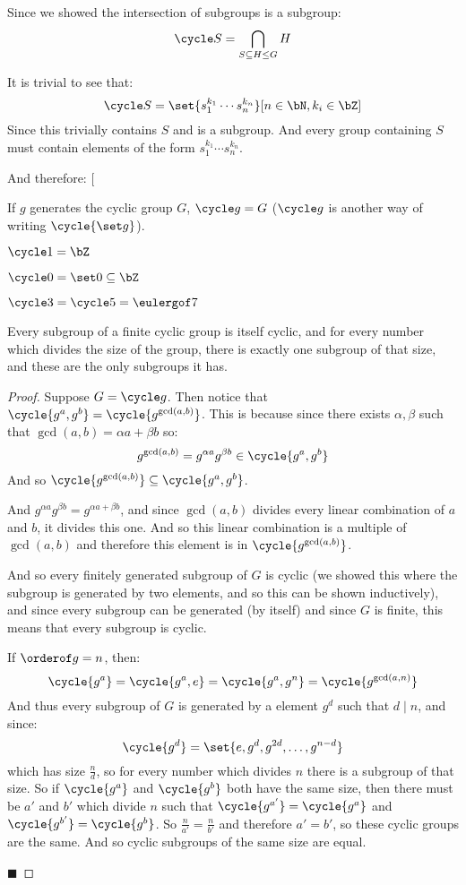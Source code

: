 \documentclass[10pt]{article}
\makeatletter
\def\@blist[#1]{%
    \bgroup\bgroup\par\vskip-\medskipamount%
    \gdef\item{%
        \par\egroup\bgroup\medskip\setbox0=\hbox{#1\quad}%
        \advance\leftskip by \wd0\leavevmode\kern-\wd0\box0%
    }%
}
\def\blist{\@ifnextchar[ \@blist {\@blist[$\bullet$]}}
\def\elist{\par\egroup\egroup\medskip}
\let\divides=\mid
\makeatother
\begin{document}
Since we showed the intersection of subgroups is a subgroup:
\[ \cycle S = \bigcap_{S\subseteq H\leq G} H \]

It is trivial to see that:
\[ \cycle S = \set{s_1^{k_1}\cdots s_n^{k_n}}[n\in\bN, k_i\in\bZ] \]
Since this trivially contains $S$ and is a subgroup.
And every group containing $S$ must contain elements of the form $s_1^{k_1}\cdots s_n^{k_n}$.

And therefore:
\blist
    \item If $g$ generates the cyclic group $G$, $\cycle g = G$ ($\cycle g$ is another way of writing $\cycle{\set g}$).
    \item $\cycle 1 = \bZ$
    \item $\cycle 0 = \set 0 \subseteq \bZ$
    \item $\cycle 3 = \cycle 5 = \eulergof 7$
\elist

\begin{thrm*}

    Every subgroup of a finite cyclic group is itself cyclic, and for every number which divides the size of the group, there is exactly one subgroup of that size,
    and these are the only subgroups it has.

\end{thrm*}

\begin{proof}

    Suppose $G=\cycle g$.
    Then notice that $\cycle{g^a, g^b}=\cycle{g^{\gcd(a,b)}}$.
    This is because since there exists $\alpha,\beta$ such that $\gcd(a,b)=\alpha a+\beta b$ so:
    \[ g^{\gcd(a,b)} = g^{\alpha a}g^{\beta b}\in\cycle{g^a, g^b} \]
    And so $\cycle{g^{\gcd(a,b)}}\subseteq\cycle{g^a,g^b}$.

    And $g^{\alpha a}g^{\beta b}=g^{\alpha a + \beta b}$, and since $\gcd(a,b)$ divides every linear combination of $a$ and $b$, it divides this one.
    And so this linear combination is a multiple of $\gcd(a,b)$ and therefore this element is in $\cycle{g^{\gcd(a,b)}}$.

    And so every finitely generated subgroup of $G$ is cyclic (we showed this where the subgroup is generated by two elements, and so this can be shown inductively), and since
    every subgroup can be generated (by itself) and since $G$ is finite, this means that every subgroup is cyclic.

    If $\orderof g=n$, then:
        \[ \cycle{g^a} = \cycle{g^a, e} = \cycle{g^a, g^n} = \cycle{g^{\gcd(a,n)}} \]
    And thus every subgroup of $G$ is generated by a element $g^d$ such that $d\divides n$, and since:
        \[ \cycle{g^d} = \set{e, g^d, g^{2d}, \dots, g^{n-d}} \]
    which has size $\frac nd$, so for every number which divides $n$ there is a subgroup of that size.
    So if $\cycle{g^a}$ and $\cycle{g^b}$ both have the same size, then there must be $a'$ and $b'$ which divide $n$ such that $\cycle{g^{a'}}=\cycle{g^a}$ and
    $\cycle{g^{b'}}=\cycle{g^b}$.
    So $\frac n{a'}=\frac n{b'}$ and therefore $a'=b'$, so these cyclic groups are the same.
    And so cyclic subgroups of the same size are equal.

    \hfill$\blacksquare$

\end{proof}
\end{document}
